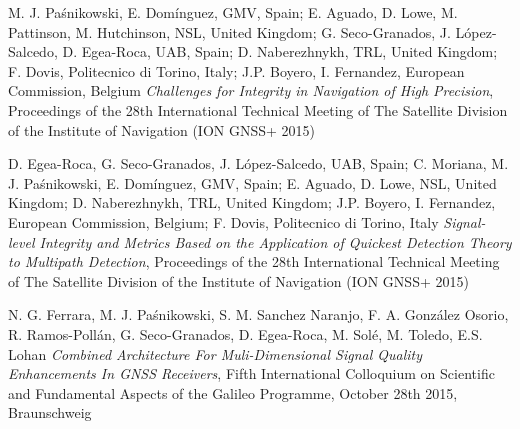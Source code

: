 \documentclass[english,a4paper]{europasscv}
\begin{document}
\begin{europasscv}
{M. J. Paśnikowski, E. Domínguez, GMV, Spain; E. Aguado, D. Lowe, M. Pattinson, M. Hutchinson, NSL, United Kingdom; G. Seco-Granados, J. López-Salcedo, D. Egea-Roca, UAB, Spain; D. Naberezhnykh, TRL, United Kingdom; F. Dovis, Politecnico di Torino, Italy; J.P. Boyero, I. Fernandez, European Commission, Belgium \textit{Challenges for Integrity in Navigation of High Precision}, Proceedings of the 28th International Technical Meeting of The Satellite Division of the Institute of Navigation (ION GNSS+ 2015)

D. Egea-Roca, G. Seco-Granados, J. López-Salcedo, UAB, Spain; C. Moriana, M. J. Paśnikowski, E. Domínguez, GMV, Spain; E. Aguado, D. Lowe, NSL, United Kingdom; D. Naberezhnykh, TRL, United Kingdom; J.P. Boyero, I. Fernandez, European Commission, Belgium; F. Dovis, Politecnico di Torino, Italy \textit{Signal-level Integrity and Metrics Based on the Application of Quickest Detection Theory to Multipath Detection}, Proceedings of the 28th International Technical Meeting of The Satellite Division of the Institute of Navigation (ION GNSS+ 2015)

N. G. Ferrara, M. J. Paśnikowski, S. M. Sanchez Naranjo, F. A. González Osorio, R. Ramos-Pollán, G. Seco-Granados, D. Egea-Roca, M. Solé, M. Toledo, E.S. Lohan \textit{Combined Architecture For Muli-Dimensional Signal Quality Enhancements In GNSS Receivers}, Fifth International Colloquium on Scientific and Fundamental Aspects of the Galileo Programme, October 28th 2015, Braunschweig
}
  
  \end{europasscv}
\end{document}

